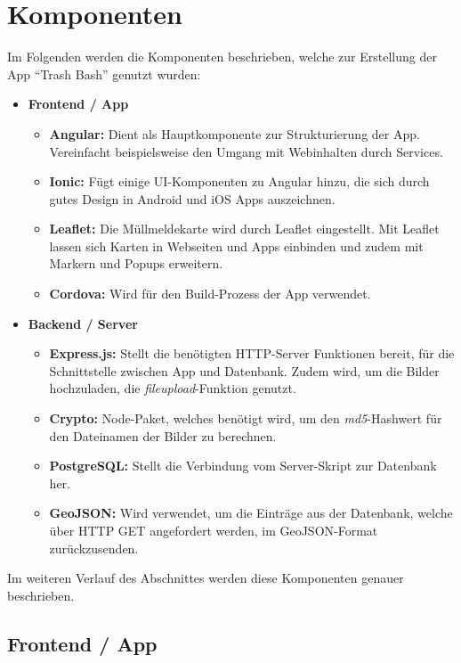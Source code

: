 \documentclass[a4paper, 11pt, DIV=11, listof=numbered, numbers=noenddot]{scrartcl}
\begin{document}
	\section{Komponenten}
	Im Folgenden werden die Komponenten beschrieben, welche zur Erstellung der App \enquote{Trash Bash} genutzt wurden:

	\begin {itemize}
	\item \textbf{Frontend / App}
		\begin {itemize}
		\item \textbf{Angular:} Dient als Hauptkomponente zur Strukturierung der App. Vereinfacht beispielsweise den Umgang mit Webinhalten durch Services.
		\item \textbf{Ionic:} Fügt einige UI-Komponenten zu Angular hinzu, die sich durch gutes Design in Android und iOS Apps auszeichnen.
		\item \textbf{Leaflet:} Die Müllmeldekarte wird durch Leaflet eingestellt. Mit Leaflet lassen sich Karten in Webseiten und Apps einbinden und zudem mit Markern und Popups erweitern.
		\item \textbf{Cordova:} Wird für den Build-Prozess der App verwendet.
		\end {itemize}
	\item \textbf{Backend / Server}
		\begin {itemize}
			\item \textbf{Express.js:} Stellt die benötigten HTTP-Server Funktionen bereit, für die Schnittstelle zwischen App und Datenbank. Zudem wird, um die Bilder hochzuladen, die \textit{fileupload}-Funktion genutzt.
			\item \textbf{Crypto:} Node-Paket, welches benötigt wird, um den \textit{md5}-Hashwert für den Dateinamen der Bilder zu berechnen.
			\item \textbf{PostgreSQL:} Stellt die Verbindung vom Server-Skript zur Datenbank her.
			\item \textbf{GeoJSON:} Wird verwendet, um die Einträge aus der Datenbank, welche über HTTP GET angefordert werden, im GeoJSON-Format \cite{@Geojson} zurückzusenden. 
		\end {itemize}
	\end {itemize}

	Im weiteren Verlauf des Abschnittes werden diese Komponenten genauer beschrieben.

	\subsection{Frontend / App}
\end{document}
